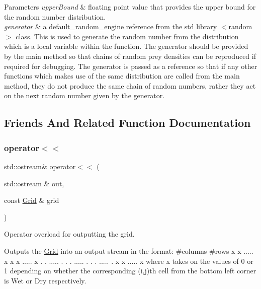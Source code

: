 \begin{DoxyParams}{Parameters}
{\em upper\+Bound} & floating point value that provides the upper bound for the random number distribution.\\
\hline
{\em generator} & a default\+\_\+random\+\_\+engine reference from the std library $<$random$>$ class. This is used to generate the random number from the distribution which is a local variable within the function. The generator should be provided by the main method so that chains of random prey densities can be reproduced if required for debugging. The generator is passed as a reference so that if any other functions which makes use of the same distribution are called from the main method, they do not produce the same chain of random numbers, rather they act on the next random number given by the generator. \\
\hline
\end{DoxyParams}


\subsection{Friends And Related Function Documentation}
\mbox{\label{class_grid_a3513576c9cced69b185e4be8fe248e8c}} 
\subsubsection{\texorpdfstring{operator$<$$<$}{operator<<}}
{\footnotesize\ttfamily std\+::ostream\& operator$<$$<$ (\begin{DoxyParamCaption}\item[{std\+::ostream \&}]{out,  }\item[{const \hyperlink{class_grid}{Grid} \&}]{grid }\end{DoxyParamCaption})\hspace{0.3cm}{\ttfamily [friend]}}



Operator overload for outputting the grid. 

Outputs the \hyperlink{class_grid}{Grid} into an output stream in the format\+: \#columns \#rows x x ..... x x x ..... x . . ..... . . . ..... . . . ..... . x x ..... x where x takes on the values of 0 or 1 depending on whether the corresponding (i,j)th cell from the bottom left corner is Wet or Dry respectively.

